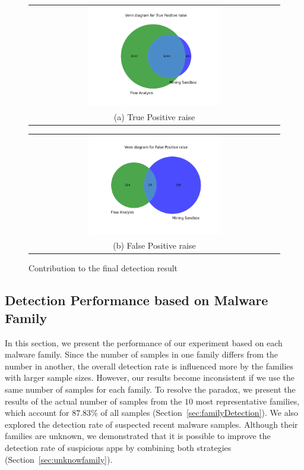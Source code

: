 \begin{figure}[t!]
  \centering
  \begin{tabular}{@{}c@{}}
    \includegraphics[width=0.54\textwidth]{image/vennTP.png} \\[\abovecaptionskip]
    \small (a) True Positive raise
  \end{tabular}

  \begin{tabular}{@{}c@{}}
    \includegraphics[width=0.54\textwidth]{image/vennFP.png} \\[\abovecaptionskip]
    \small (b) False Positive raise
  \end{tabular}

  \caption{Contribution to the final detection result}\label{fig:venn}
\end{figure}






\subsection{Detection Performance based on Malware Family}\label{sec:family}

In this section, we present the performance of our experiment based on each malware family. Since the number of samples in one family differs from the number in another, the overall detection rate is influenced more by the families with larger sample sizes. However, our results become inconsistent if we use the same number of samples for each family. To resolve the paradox, we present the results of the actual number of samples from the $10$ most representative families, which account for $87.83\%$ of all samples (Section~\ref{sec:familyDetection}). We also explored the detection rate of suspected recent malware samples. Although their families are unknown, we demonstrated that it is possible to improve the detection rate of suspicious apps by combining both strategies (Section~\ref{sec:unknowfamily}).


